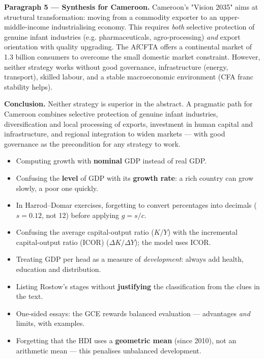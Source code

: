 \documentclass[11pt]{article}
\newcommand{\cle}[1]{{\popxbold\color{popdark}#1}}
\begin{document}
\begin{exoresolu}
\textbf{Paragraph 5 — Synthesis for Cameroon.} Cameroon's "Vision 2035" aims at structural transformation: moving from a commodity exporter to an upper-middle-income industrialising economy. This requires \emph{both} selective protection of genuine infant industries (e.g. pharmaceuticals, agro-processing) \emph{and} export orientation with quality upgrading. The \cle{AfCFTA} offers a continental market of 1.3 billion consumers to overcome the small domestic market constraint. However, neither strategy works without \cle{good governance}, infrastructure (energy, transport), skilled labour, and a stable macroeconomic environment (CFA franc stability helps).

\textbf{Conclusion.} Neither strategy is superior in the abstract. A pragmatic path for Cameroon combines selective protection of genuine infant industries, diversification and local processing of exports, investment in human capital and infrastructure, and regional integration to widen markets — with good governance as the precondition for any strategy to work.
\end{exoresolu}

\begin{attention}
\begin{itemize}
\item Computing growth with \textbf{nominal} GDP instead of real GDP.
\item Confusing the \textbf{level} of GDP with its \textbf{growth rate}: a rich country can grow slowly, a poor one quickly.
\item In Harrod--Domar exercises, forgetting to convert percentages into decimals ($s = 0.12$, not 12) before applying $g = s/c$.
\item Confusing the \cle{average capital-output ratio} ($K/Y$) with the \cle{incremental capital-output ratio (ICOR)} ($\Delta K/\Delta Y$); the model uses ICOR.
\item Treating GDP per head as a measure of \emph{development}: always add health, education and distribution.
\item Listing Rostow's stages without \textbf{justifying} the classification from the clues in the text.
\item One-sided essays: the GCE rewards balanced evaluation — advantages \emph{and} limits, with examples.
\item Forgetting that the HDI uses a \textbf{geometric mean} (since 2010), not an arithmetic mean — this penalises unbalanced development.
\end{itemize}
\end{attention}
\end{document}
